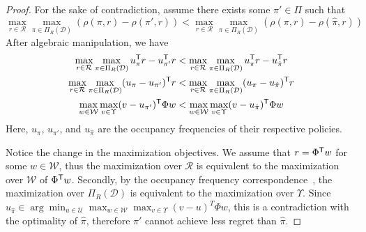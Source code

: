 \documentclass[11pt]{uai2023}
\begin{document}
\chebeyshevRegret*
\begin{proof}
	For the sake of contradiction,
	assume there exists some $\pi' \in \Pi$ such that
	\[
		\max_{r\in \mathcal{R}} \max_{\pi \in \Pi_{R}(\mathcal{D})}
		\left(\rho(\pi,r) - \rho(\pi', r)\right) < \max_{r\in \mathcal{R}}
		\max_{\pi \in \Pi_{R}(\mathcal{D})}
		\left(\rho(\pi, r) - \rho(\hat{\pi}, r)\right)
	\]
	After algebraic manipulation, we have
	\begin{align*}
		\max_{r\in \mathcal{R}} \max_{\pi \in \Pi_{R}
			(\mathcal{D})} u_{\pi}^{\mathsf{T}} r - u_{\pi'}^{\mathsf{T}} r
		 & < \max_{r\in \mathcal{R}}
		\max_{\pi \in \Pi_{R}
			(\mathcal{D})} u_{\pi}^{\mathsf{T}} r - u_{\hat{\pi}}
		^{\mathsf{T}} r                                              \\
		\max_{r\in \mathcal{R}} \max_{\pi \in \Pi_{R}(\mathcal{D})}
		(u_{\pi} - u_{\pi'})^{\mathsf{T}} r
		 & < \max_{r\in \mathcal{R}}
		\max_{\pi \in \Pi_{R}(\mathcal{D})}
		(u_{\pi} - u_{\hat{\pi}})^{\mathsf{T}} r
		\\
		\max_{w\in \mathcal{W}} \max_{v \in \Upsilon} (v - u_{\pi'})^{\mathsf{T}} \Phi w
		 & < \max_{w\in \mathcal{W}} \max_{v \in \Upsilon}
		(v - u_{\hat{\pi}})^{\mathsf{T}} \Phi w
	\end{align*}
	Here, $u_{\pi}$, $u_{\pi'}$, and $u_{\hat{\pi}}$
	are the occupancy frequencies of their respective policies.

	Notice the change in the maximization objectives.
	We assume that $r = \Phi^{\mathsf{T}} w$ for some $w \in \mathcal{W}$,
	thus the maximization over $\mathcal{R}$ is equivalent to the maximization
	over $\mathcal{W}$ of $\Phi^{\mathsf{T}} w$.
	Secondly, by the occupancy frequency correspondence~\cite{Puterman1994}, the
	maximization over $\Pi_R(\mathcal{D})$ is equivalent to the maximization over
	$\Upsilon$.
	Since $u_{\hat{\pi}} \in \arg\min_{u \in \mathcal{U}} \max_{w \in \mathcal{W}} \max_{v \in \Upsilon} {(v - u)}^T \Phi w$,
	this is a contradiction with the optimality of $\hat{\pi}$,
	therefore $\pi'$ cannot achieve less regret than $\hat{\pi}$.
\end{proof}
\end{document}
